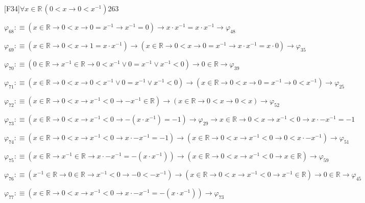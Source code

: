 \begin{fullproof}{[F34]}{$\forall x \in \mathbb{R}\,(0 < x \to 0 < x^{-1})$}{263}
\begin{abbrevlist}
\item $\varphi_{68} :\equiv (x \in \mathbb{R} \to 0 < x \to 0 = x^{-1} \to x^{-1} = 0) \to x \cdot x^{-1} = x \cdot x^{-1} \to \varphi_{48}$
\item $\varphi_{69} :\equiv (x \in \mathbb{R} \to 0 < x \to 1 = x \cdot x^{-1}) \to (x \in \mathbb{R} \to 0 < x \to 0 = x^{-1} \to x \cdot x^{-1} = x \cdot 0) \to \varphi_{35}$
\item $\varphi_{70} :\equiv (0 \in \mathbb{R} \to x^{-1} \in \mathbb{R} \to 0 < x^{-1} \lor 0 = x^{-1} \lor x^{-1} < 0) \to 0 \in \mathbb{R} \to \varphi_{39}$
\item $\varphi_{71} :\equiv (x \in \mathbb{R} \to 0 < x \to 0 < x^{-1} \lor 0 = x^{-1} \lor x^{-1} < 0) \to (x \in \mathbb{R} \to 0 < x \to 0 = x^{-1} \to 0 < x^{-1}) \to \varphi_{25}$
\item $\varphi_{72} :\equiv (x \in \mathbb{R} \to 0 < x \to x^{-1} < 0 \to -x^{-1} \in \mathbb{R}) \to (x \in \mathbb{R} \to 0 < x \to 0 < x) \to \varphi_{52}$
\item $\varphi_{73} :\equiv (x \in \mathbb{R} \to 0 < x \to x^{-1} < 0 \to -(x \cdot x^{-1}) = -1) \to \varphi_{29} \to x \in \mathbb{R} \to 0 < x \to x^{-1} < 0 \to x \cdot -x^{-1} = -1$
\item $\varphi_{74} :\equiv (x \in \mathbb{R} \to 0 < x \to x^{-1} < 0 \to x \cdot -x^{-1} = -1) \to (x \in \mathbb{R} \to 0 < x \to x^{-1} < 0 \to 0 < x \cdot -x^{-1}) \to \varphi_{51}$
\item $\varphi_{75} :\equiv (x \in \mathbb{R} \to x^{-1} \in \mathbb{R} \to x \cdot -x^{-1} = -(x \cdot x^{-1})) \to (x \in \mathbb{R} \to 0 < x \to x^{-1} < 0 \to x \in \mathbb{R}) \to \varphi_{59}$
\item $\varphi_{76} :\equiv (x^{-1} \in \mathbb{R} \to 0 \in \mathbb{R} \to x^{-1} < 0 \to -0 < -x^{-1}) \to (x \in \mathbb{R} \to 0 < x \to x^{-1} < 0 \to x^{-1} \in \mathbb{R}) \to 0 \in \mathbb{R} \to \varphi_{45}$
\item $\varphi_{77} :\equiv (x \in \mathbb{R} \to 0 < x \to x^{-1} < 0 \to x \cdot -x^{-1} = -(x \cdot x^{-1})) \to \varphi_{73}$
\end{abbrevlist}
\end{fullproof}
